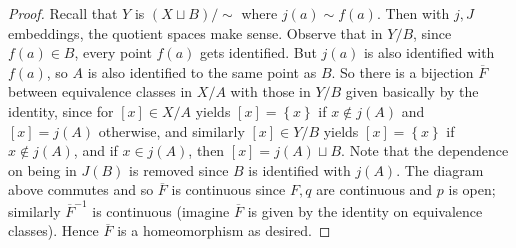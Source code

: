 \documentclass[11pt]{article}
\newcommand{\cbr}[1]{\left\{#1\right\}}
\begin{document}
\begin{enumerate}
\begin{proof}
      Recall that $Y$ is $(X\sqcup B)/\sim$ where $j(a)\sim f(a)$. Then with $j,J$ embeddings, the quotient spaces make sense. Observe that in $Y/B$, since $f(a)\in B$, every point $f(a)$ gets identified. But $j(a)$ is also identified with $f(a)$, so $A$ is also identified to the same point as $B$. So there is a bijection $\overline{F}$ between equivalence classes in $X/A$ with those in $Y/B$ given basically by the identity, since for $[x]\in X/A$ yields $[x] = \cbr{x}$ if $x\notin j(A)$ and $[x] = j(A)$ otherwise, and similarly $[x]\in Y/B$ yields $[x] =\cbr{x}$ if $x\notin j(A)$, and if $x\in j(A)$, then $[x] = j(A)\sqcup B$. Note that the dependence on being in $J(B)$ is removed since $B$ is identified with $j(A)$. The diagram above commutes and so $\overline{F}$ is continuous since $F,q$ are continuous and $p$ is open; similarly $\overline{F}^{-1}$ is continuous (imagine  $\overline{F}$ is given by the identity on equivalence classes). Hence $\overline{F}$ is a homeomorphism as desired.
    \end{proof}
\end{enumerate}
\end{document}
